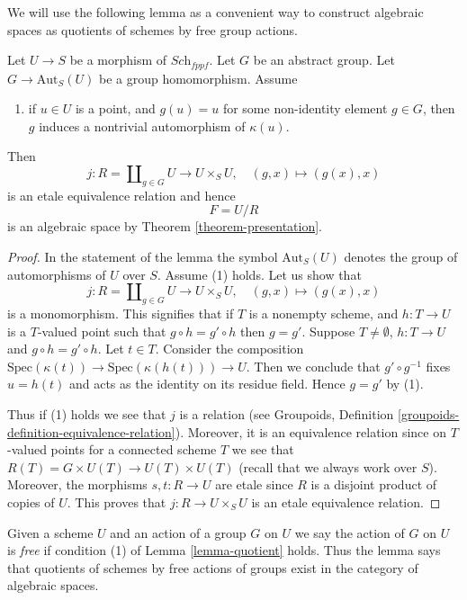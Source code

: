 \noindent
We will use the following lemma as a convenient way to construct
algebraic spaces as quotients of schemes by free group actions.

\begin{lemma}
\label{lemma-quotient}
Let $U \to S$ be a morphism of $\textit{Sch}_{fppf}$.
Let $G$ be an abstract group. Let $G \to \text{Aut}_S(U)$
be a group homomorphism. Assume
\begin{enumerate}
\item if $u \in U$ is a point, and $g(u) = u$
for some non-identity element $g \in G$, then $g$
induces a nontrivial automorphism of $\kappa(u)$.
\end{enumerate}
Then
$$
j :
R = \coprod\nolimits_{g \in G} U
\longrightarrow
U \times_S U,
\quad
(g, x) \longmapsto (g(x), x)
$$
is an etale equivalence relation and hence
$$
F = U/R
$$
is an algebraic space by Theorem \ref{theorem-presentation}.
\end{lemma}

\begin{proof}
In the statement of the lemma the symbol $\text{Aut}_S(U)$ denotes
the group of automorphisms of $U$ over $S$.
Assume (1) holds. Let us show that
$$
j :
R = \coprod\nolimits_{g \in G} U
\longrightarrow
U \times_S U,
\quad
(g, x) \longmapsto (g(x), x)
$$
is a monomorphism. This signifies that if $T$ is a nonempty
scheme, and $h : T \to U$ is a $T$-valued point such that
$g \circ h = g' \circ h$ then $g = g'$. Suppose
$T \not = \emptyset$, $h : T \to U$ and $g \circ h = g' \circ h$.
Let $t \in T$. Consider the composition
$\text{Spec}(\kappa(t)) \to \text{Spec}(\kappa(h(t))) \to U$.
Then we conclude that $g' \circ g^{-1}$ fixes $u = h(t)$ and
acts as the identity on its residue field. Hence $g = g'$ by (1).

\medskip\noindent
Thus if (1) holds we see that $j$ is a relation (see
Groupoids, Definition \ref{groupoids-definition-equivalence-relation}).
Moreover, it is an equivalence relation since on $T$-valued points
for a connected scheme $T$ we see that
$R(T) = G \times U(T) \to U(T) \times U(T)$ (recall that we always
work over $S$). Moreover, the morphisms $s, t : R \to U$ are etale
since $R$ is a disjoint product of copies of $U$.
This proves that $j : R \to U \times_S U$ is an etale equivalence relation.
\end{proof}

\noindent
Given a scheme $U$ and an action of a group $G$ on $U$ we say the action
of $G$ on $U$ is {\it free} if condition (1) of Lemma \ref{lemma-quotient}
holds. Thus the lemma says that quotients of schemes by free actions
of groups exist in the category of algebraic spaces.

